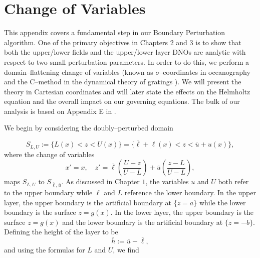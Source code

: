 \chapter{Change of Variables}
\label{Appendix C: Change of Variables}
\thispagestyle{pageonbottom}

\pagestyle{fancy}
\renewcommand{\sectionmark}[1]{\markright{#1}}
\fancyhead{}
\fancyhead[LE,RO]{\thepage}
\fancyfoot[L,R,C]{}
\renewcommand{\headrulewidth}{1pt}%

This appendix covers a fundamental step in our Boundary Perturbation algorithm. One of the primary objectives in Chapters $2$ and $3$ is to show that both the upper/lower fields and the upper/lower layer DNOs are analytic with respect to two small perturbation parameters. In order to do this, we perform a domain--flattening change of variables (known as $\sigma$--coordinates in oceanography \cite{Phillips57} and the C--method in the dynamical theory of gratings \cite{CDCM82,CMR80}). We will present the theory in Cartesian coordinates and will later state the effects on the Helmholtz equation and the overall impact on our governing equations. The bulk of our analysis is based on Appendix E in \cite{HOPS_Notes}.
\vspace{3mm}
\begin{flushleft}
We begin by considering the doubly--perturbed domain
\end{flushleft}
\begin{equation}
S_{L,U}:=\{L(x)<z<U(x)\}=\{\overline{\ell}+\ell(x)<z<\overline{u}+u(x)\},    
\end{equation}
where the change of variables 
\begin{equation}
    x'=x,\quad z'=\overline{\ell}\left(\frac{U-z}{U-L}\right)+\overline{u}\left(\frac{z-L}{U-L}\right),
\end{equation}
maps $S_{L,U}$ to $S_{\overline{\ell},\overline{u}}$. As discussed in Chapter $1$, the variables $u$ and $U$ both refer to the upper boundary while $\ell$ and $L$ reference the lower boundary. In the upper layer, the upper boundary is the artificial boundary at $\{z=a\}$ while the lower boundary is the surface $z=g(x)$. In the lower layer, the upper boundary is the surface $z=g(x)$ and the lower boundary is the artificial boundary at $\{z=-b\}$.  Defining the height of the layer to be
$$\overline{h}:=\overline{u}-\overline{\ell},$$
and using the formulas for $L$ and $U$, we find

